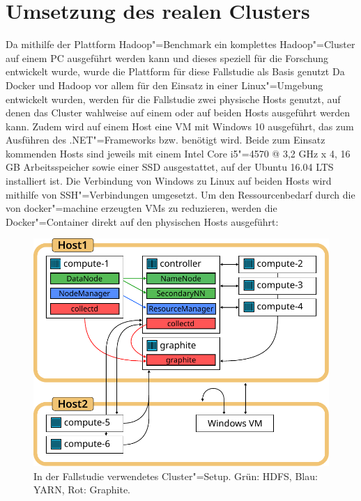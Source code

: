 \section{Umsetzung des realen Clusters}
\label{sec:aufbauCluster}

Da mithilfe der Plattform Hadoop"=Benchmark ein komplettes Hadoop"=Cluster auf einem PC ausgeführt werden kann und dieses speziell für die Forschung entwickelt wurde, wurde die Plattform für diese Fallstudie als Basis genutzt
Da Docker und Hadoop vor allem für den Einsatz in einer Linux"=Umgebung entwickelt wurden, werden für die Fallstudie zwei physische Hosts genutzt, auf denen das Cluster wahlweise auf einem oder auf beiden Hosts ausgeführt werden kann.
Zudem wird auf einem Host eine VM mit Windows 10 ausgeführt, das zum Ausführen des .NET"=Frameworks bzw. \sS benötigt wird.
Beide zum Einsatz kommenden Hosts sind jeweils mit einem Intel Core i5"=4570 @ 3,2 GHz x 4, 16 GB Arbeitsspeicher sowie einer SSD ausgestattet, auf der Ubuntu 16.04 LTS installiert ist.
Die Verbindung von Windows zu Linux auf beiden Hosts wird mithilfe von SSH"=Verbindungen umgesetzt.
Um den Ressourcenbedarf durch die von docker"=machine erzeugten VMs zu reduzieren, werden die Docker"=Container direkt auf den physischen Hosts ausgeführt:

\begin{figure}[h]
    \includegraphics{./images/caseStudyHadoopSetup.pdf}
    \caption[In der Fallstudie verwendetes Cluster"=Setup]
    {In der Fallstudie verwendetes Cluster"=Setup.
        Grün: \ac{HDFS}, Blau: YARN, Rot: Graphite.}
    \label{fig:caseStudyHadoopSetup}
\end{figure}

